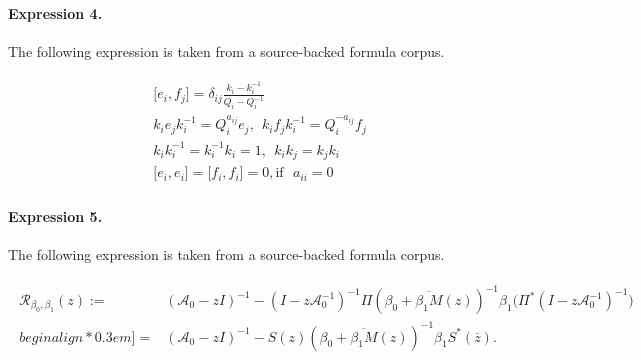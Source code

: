 \documentclass[11pt]{article}
\begin{document}
\paragraph{Expression 4.} The following expression is taken from a source-backed formula corpus.

\begin{align*}\begin{array}{c} \lbrack e_{i}, f_{j} \rbrack = \delta_{ij} \frac{k_{i} - k_{i}^{-1}}{Q_{i} -Q_{i}^{-1}} \\ k_{i}e_{j}k_{i}^{-1}= Q_{i}^{a_{ij}} e_{j},~~k_{i}f_{j}k_{i}^{-1}= Q_{i}^{-a_{ij}} f_{j}\\ k_{i}k_{i}^{-1}=k_{i}^{-1}k_{i}=1,~~k_{i}k_{j} = k_{j}k_{i}\\ \lbrack e_{i}, e_{i} \rbrack = \lbrack f_{i}, f_{i} \rbrack = 0, \text{if} ~~~a_{ii} = 0 \end{array}\end{align*}

\paragraph{Expression 5.} The following expression is taken from a source-backed formula corpus.

\begin{align*} \begin{aligned} \mathcal{R}_{\beta_0,\beta_1}(z):=&(\mathcal{A}_0 -zI)^{-1} - \left(I-z \mathcal{A}_0^{-1}\right)^{-1}\Pi(\overline{\beta_0 + \beta_1 M(z)})^{-1}\beta_1\bigl(\Pi^*\left( I - z \mathcal{A}_0^{-1}\right)^{-1} \bigr)\\begin{align*}0.3em] =&(\mathcal{A}_0 -zI)^{-1}-S(z)(\overline{\beta_0 + \beta_1 M(z)})^{-1}\beta_1S^*(\overline{z}).\end{aligned}\end{align*}
\end{document}
